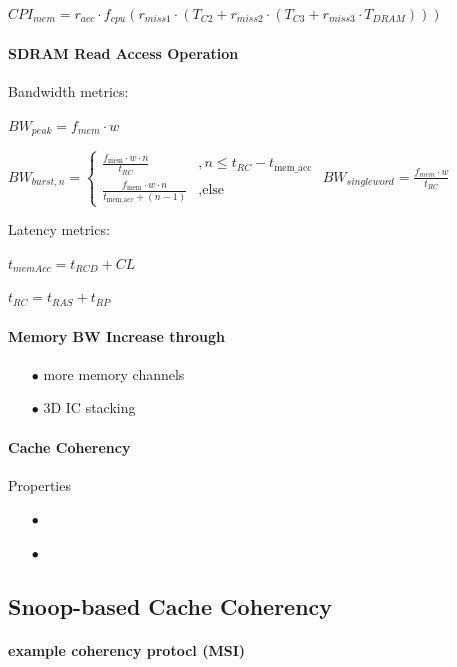 \documentclass[8pt]{extarticle}
\begin{document}
\begin{multicols*}{4}
\noindent
$CPI_{mem} = r_{acc} \cdot f_{cpu}(r_{miss1} \cdot (T_{C2} + r_{miss2} \cdot (T_{C3} + r_{miss3} \cdot T_{DRAM})))$

\paragraph{SDRAM Read Access Operation} \mbox{}   %

\noindent
Bandwidth metrics:

\noindent
$BW_{peak} = f_{mem} \cdot w$

\noindent
$BW_{burst,n} = 
\begin{cases}
\frac{f_{\text{mem}} \cdot w \cdot n}{t_{RC}} & , n \leq t_{RC} - t_{\text{mem\_acc}} \\[2ex]
    \frac{f_{\text{mem}} \cdot w \cdot n}{t_{\text{mem\_acc}} + (n-1)} & , \text{else}
\end{cases}$
$BW_{single word} = \frac{f_{mem} \cdot w}{t_{RC}}$

\noindent
Latency metrics:

\noindent

$t_{memAcc} = t_{RCD} + CL$

$t_{RC} = t_{RAS} + t_{RP}$

\paragraph{Memory BW Increase through}

\begin{enumerate}
  \item[$\bullet$] more memory channels
  \item[$\bullet$] 3D IC stacking
\end{enumerate}


\paragraph{Cache Coherency} Properties
\begin{enumerate}
  \item[$\bullet$] 
  \item[$\bullet$] 
\end{enumerate}

\subsection{Snoop-based Cache Coherency}

\paragraph{example coherency protocl (MSI)}


\end{multicols*}
\end{document}
